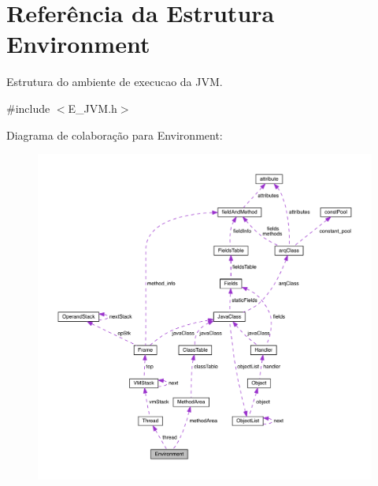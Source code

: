 \hypertarget{struct_environment}{}\section{Referência da Estrutura Environment}
\label{struct_environment}


Estrutura do ambiente de execucao da J\+V\+M.  




{\ttfamily \#include $<$E\+\_\+\+J\+V\+M.\+h$>$}



Diagrama de colaboração para Environment\+:\nopagebreak
\begin{figure}[H]
\begin{center}
\leavevmode
\includegraphics[width=350pt]{struct_environment__coll__graph}
\end{center}
\end{figure}
